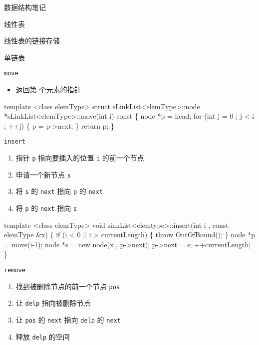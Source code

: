 \documentclass[
  ignorenonframetext,
]{beamer}
\newenvironment{Shaded}{}{}
\newcommand{\NormalTok}[1]{#1}
\providecommand{\tightlist}{%
  \setlength{\itemsep}{0pt}\setlength{\parskip}{0pt}}
\begin{document}
\begin{frame}[fragile]{数据结构笔记}
\begin{block}{线性表}
\begin{block}{线性表的链接存储}
\begin{block}{单链表}
\begin{block}{\texttt{move}}
\protect{}\label{move}
\begin{itemize}
\tightlist
\item
  返回第 {} 个元素的指针
\end{itemize}

\begin{Shaded}
\begin{Highlighting}[]
\NormalTok{template \textless{}class elemType\textgreater{}}
\NormalTok{struct sLinkList\textless{}elemType\textgreater{}::node *sLinkList\textless{}elemType\textgreater{}::move(int i) const}
\NormalTok{\{}
\NormalTok{  node *p = head;}
\NormalTok{  for (int j = 0 ; j \textless{} i ; ++j)}
\NormalTok{  \{}
\NormalTok{    p = p{-}\textgreater{}next;}
\NormalTok{  \}}
\NormalTok{  return p;}
\NormalTok{\}}
\end{Highlighting}
\end{Shaded}
\end{block}

\begin{block}{\texttt{insert}}
\protect{}\label{insert-1}
\begin{enumerate}
\tightlist
\item
  指针 \texttt{p} 指向要插入的位置 \texttt{i} 的前一个节点
\item
  申请一个新节点 \texttt{s}
\item
  将 \texttt{s} 的 \texttt{next} 指向 \texttt{p} 的 \texttt{next}
\item
  将 \texttt{p} 的 \texttt{next} 指向 \texttt{s}
\end{enumerate}


\begin{Shaded}
\begin{Highlighting}[]
\NormalTok{template \textless{}class elemType\textgreater{}}
\NormalTok{void sinkList\textless{}elemtype\textgreater{}::insert(int i , const elemType \&x)}
\NormalTok{\{}
\NormalTok{  if (i \textless{} 0 || i \textgreater{} currentLength)}
\NormalTok{  \{}
\NormalTok{    throw OutOfBound();}
\NormalTok{  \}}
\NormalTok{  node *p = move(i{-}1);}
\NormalTok{  node *s = new node(x , p{-}\textgreater{}next);}
\NormalTok{  p{-}\textgreater{}next = s;}
\NormalTok{  ++currentLength;}
\NormalTok{\}}
\end{Highlighting}
\end{Shaded}
\end{block}

\begin{block}{\texttt{remove}}
\protect{}\label{remove-1}
\begin{enumerate}
\tightlist
\item
  找到被删除节点的前一个节点 \texttt{pos}
\item
  让 \texttt{delp} 指向被删除节点
\item
  让 \texttt{pos} 的 \texttt{next} 指向 \texttt{delp} 的 \texttt{next}
\item
  释放 \texttt{delp} 的空间
\end{enumerate}



\end{block}
\end{block}
\end{block}
\end{block}
\end{frame}
\end{document}
